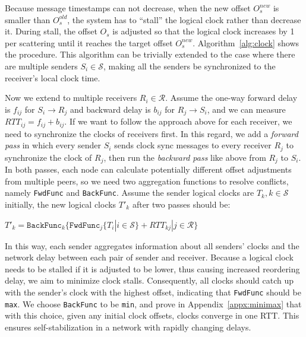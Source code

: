 {%
Because message timestamps can not decrease, when the new offset $O_s^{new}$ is smaller than $O_s^{old}$, the system has to ``stall'' the logical clock rather than decrease it.
During stall, the offset $O_s$ is adjusted so that the logical clock increases by 1 per scattering until it reaches the target offset $O_s^{new}$. Algorithm~\ref{alg:clock} shows the procedure. This algorithm can be trivially extended to the case where there are multiple senders $S_i \in \mathcal{S}$, making all the senders be synchronized to the receiver's local clock time.

Now we extend to multiple receivers $R_i \in \mathcal{R}$.
Assume the one-way forward delay is $f_{ij}$ for $S_i \rightarrow R_j$ and backward delay is $b_{ij}$ for $R_j \rightarrow S_i$, and we can measure $RTT_{ij} = f_{ij} + b_{ij}$.
If we want to follow the approach above for each receiver, we need to synchronize the clocks of receivers first.
In this regard, we add a \textit{forward pass} in which every sender $S_i$ sends clock sync messages to every receiver $R_j$ to synchronize the clock of $R_j$, then run the \textit{backward pass} like above from $R_j$ to $S_i$.
In both passes, each node can calculate potentially different offset adjustments from multiple peers, so we need two aggregation functions to resolve conflicts, namely \texttt{FwdFunc} and \texttt{BackFunc}.
Assume the sender logical clocks are $T_k, k \in \mathcal{S}$ initially, the new logical clocks $T'_k$ after two passes should be:

{\small{$T'_k  = \texttt{BackFunc}_k \{ \texttt{FwdFunc}_j \{ T_i | i \in \mathcal{S} \} + RTT_{kj} | j \in \mathcal{R} \}$}}

In this way, each sender aggregates information about all senders' clocks and the network delay between each pair of sender and receiver.
Because a logical clock needs to be stalled if it is adjusted to be lower, thus causing increased reordering delay, we aim to minimize clock stalls.
Consequently, all clocks should catch up with the sender's clock with the highest offset, indicating that \texttt{FwdFunc} should be \texttt{max}.
We choose \texttt{BackFunc} to be \texttt{min}, and prove in Appendix~\ref{appx:minimax} that with this choice, given any initial clock offsets, clocks converge in one RTT.
This ensures self-stabilization in a network with rapidly changing delays.

}

